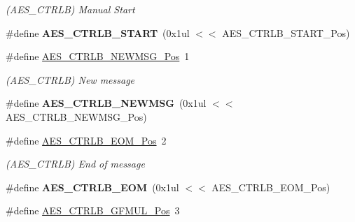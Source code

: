 \begin{DoxyCompactItemize}
\begin{DoxyCompactList}\small\item\em (A\+E\+S\+\_\+\+C\+T\+R\+L\+B) Manual Start \end{DoxyCompactList}\item 
\hypertarget{group___s_a_m_l21___a_e_s_ga4ea6ae6c157958d04c50fc1baaf44448}{}\#define {\bfseries A\+E\+S\+\_\+\+C\+T\+R\+L\+B\+\_\+\+S\+T\+A\+R\+T}~(0x1ul $<$$<$ A\+E\+S\+\_\+\+C\+T\+R\+L\+B\+\_\+\+S\+T\+A\+R\+T\+\_\+\+Pos)\label{group___s_a_m_l21___a_e_s_ga4ea6ae6c157958d04c50fc1baaf44448}

\item 
\hypertarget{group___s_a_m_l21___a_e_s_ga962d612a59f8ac1b633fb52f2423a0a4}{}\#define \hyperlink{group___s_a_m_l21___a_e_s_ga962d612a59f8ac1b633fb52f2423a0a4}{A\+E\+S\+\_\+\+C\+T\+R\+L\+B\+\_\+\+N\+E\+W\+M\+S\+G\+\_\+\+Pos}~1\label{group___s_a_m_l21___a_e_s_ga962d612a59f8ac1b633fb52f2423a0a4}

\begin{DoxyCompactList}\small\item\em (A\+E\+S\+\_\+\+C\+T\+R\+L\+B) New message \end{DoxyCompactList}\item 
\hypertarget{group___s_a_m_l21___a_e_s_ga751c9256092414fa3a5ad41bd09d933c}{}\#define {\bfseries A\+E\+S\+\_\+\+C\+T\+R\+L\+B\+\_\+\+N\+E\+W\+M\+S\+G}~(0x1ul $<$$<$ A\+E\+S\+\_\+\+C\+T\+R\+L\+B\+\_\+\+N\+E\+W\+M\+S\+G\+\_\+\+Pos)\label{group___s_a_m_l21___a_e_s_ga751c9256092414fa3a5ad41bd09d933c}

\item 
\hypertarget{group___s_a_m_l21___a_e_s_gaa7b1c7532b75cda1bb64fe22119fc29f}{}\#define \hyperlink{group___s_a_m_l21___a_e_s_gaa7b1c7532b75cda1bb64fe22119fc29f}{A\+E\+S\+\_\+\+C\+T\+R\+L\+B\+\_\+\+E\+O\+M\+\_\+\+Pos}~2\label{group___s_a_m_l21___a_e_s_gaa7b1c7532b75cda1bb64fe22119fc29f}

\begin{DoxyCompactList}\small\item\em (A\+E\+S\+\_\+\+C\+T\+R\+L\+B) End of message \end{DoxyCompactList}\item 
\hypertarget{group___s_a_m_l21___a_e_s_gaa4d9675cf88a1c45b86baad3495f11af}{}\#define {\bfseries A\+E\+S\+\_\+\+C\+T\+R\+L\+B\+\_\+\+E\+O\+M}~(0x1ul $<$$<$ A\+E\+S\+\_\+\+C\+T\+R\+L\+B\+\_\+\+E\+O\+M\+\_\+\+Pos)\label{group___s_a_m_l21___a_e_s_gaa4d9675cf88a1c45b86baad3495f11af}

\item 
\hypertarget{group___s_a_m_l21___a_e_s_ga1d4dac849fc2f226972fc7915ce2bb9a}{}\#define \hyperlink{group___s_a_m_l21___a_e_s_ga1d4dac849fc2f226972fc7915ce2bb9a}{A\+E\+S\+\_\+\+C\+T\+R\+L\+B\+\_\+\+G\+F\+M\+U\+L\+\_\+\+Pos}~3\label{group___s_a_m_l21___a_e_s_ga1d4dac849fc2f226972fc7915ce2bb9a}


\end{DoxyCompactItemize}
